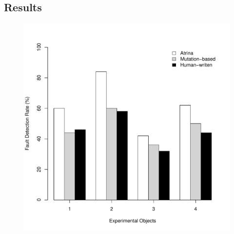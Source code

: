 \subsection{Results} \label{Sec:results}
\begin{figure}[!t]
  \centering
  \includegraphics[width=.9\hsize]{r-scripts/barplot-faultDetectionRate}
  \vspace{-0.1in} 
  \label{Fig:faultDetectionRate}
  \vspace{-0.1in} 
\end{figure}

